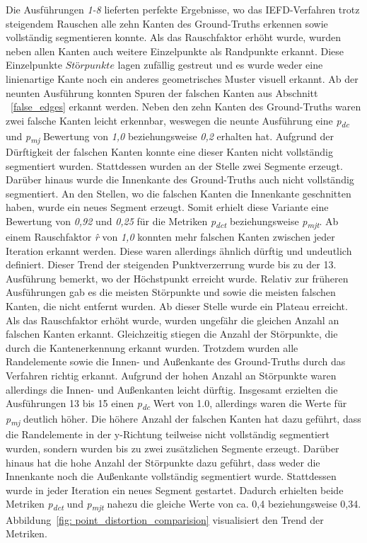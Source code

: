 Die Ausführungen \textit{1-8} lieferten perfekte Ergebnisse, wo das IEFD-Verfahren trotz steigendem Rauschen alle zehn Kanten des Ground-Truths erkennen sowie vollständig segmentieren konnte. Als das Rauschfaktor erhöht wurde, wurden neben allen Kanten auch weitere Einzelpunkte als Randpunkte erkannt. Diese Einzelpunkte \(Störpunkte\) lagen zufällig gestreut und es wurde weder eine linienartige Kante noch ein anderes geometrisches Muster visuell erkannt. Ab der neunten Ausführung konnten Spuren der falschen Kanten aus Abschnitt ~\ref{false_edges} erkannt werden. Neben den zehn Kanten des Ground-Truths waren zwei falsche Kanten leicht erkennbar, weswegen die neunte Ausführung eine \textit{p\textsubscript{dc}} und \textit{p\textsubscript{mj}} Bewertung von \textit{1,0} beziehungsweise \textit{0,2} erhalten hat. Aufgrund der Dürftigkeit der falschen Kanten konnte eine dieser Kanten nicht vollständig segmentiert wurden. Stattdessen wurden an der Stelle zwei Segmente erzeugt. Darüber hinaus wurde die Innenkante des Ground-Truths auch nicht vollständig segmentiert. An den Stellen, wo die falschen Kanten die Innenkante geschnitten haben, wurde ein neues Segment erzeugt. Somit erhielt diese Variante eine Bewertung von \textit{0,92} und \textit{0,25} für die Metriken \textit{p\textsubscript{dct}} beziehungsweise \textit{p\textsubscript{mjt}}. Ab einem Rauschfaktor \textit{\^{r}} von \textit{1,0} konnten mehr falschen Kanten zwischen jeder Iteration erkannt werden. Diese waren allerdings ähnlich dürftig und undeutlich definiert.  Dieser Trend der steigenden Punktverzerrung wurde bis zu der 13. Ausführung bemerkt, wo der Höchstpunkt erreicht wurde. Relativ zur früheren Ausführungen gab es die meisten Störpunkte und sowie die meisten falschen Kanten, die nicht entfernt wurden. Ab dieser Stelle wurde ein Plateau erreicht. Als das Rauschfaktor erhöht wurde, wurden ungefähr die gleichen Anzahl an falschen Kanten erkannt. Gleichzeitig stiegen die Anzahl der Störpunkte, die durch die Kantenerkennung erkannt wurden. Trotzdem wurden alle Randelemente sowie die Innen- und Außenkante des Ground-Truths durch das Verfahren richtig erkannt. Aufgrund der hohen Anzahl an Störpunkte waren allerdings die Innen- und Außenkanten leicht dürftig. Insgesamt erzielten die Ausführungen 13 bis 15 einen \textit{p\textsubscript{dc}} Wert von 1.0, allerdings waren die Werte für \textit{p\textsubscript{mj}} deutlich höher. Die höhere Anzahl der falschen Kanten hat dazu geführt, dass die Randelemente in der y-Richtung teilweise nicht vollständig segmentiert wurden, sondern wurden bis zu zwei zusätzlichen Segmente erzeugt. Darüber hinaus hat die hohe Anzahl der Störpunkte dazu geführt, dass weder die Innenkante noch die Außenkante vollständig segmentiert wurde. Stattdessen wurde in jeder Iteration ein neues Segment gestartet. Dadurch erhielten beide Metriken \textit{p\textsubscript{dct}} und \textit{p\textsubscript{mjt}} nahezu die gleiche Werte von ca. 0,4 beziehungsweise 0,34. Abbildung~\ref{fig: point_distortion_comparision} visualisiert den Trend der Metriken. 

